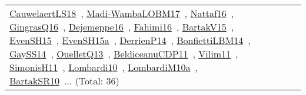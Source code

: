 {\begin{longtable}{lp{3cm}>{\raggedright\arraybackslash}p{6cm}>{\raggedright\arraybackslash}p{6cm}>{\raggedright\arraybackslash}p{8cm}}
\href{works/CauwelaertLS18.pdf}{CauwelaertLS18}~\cite{CauwelaertLS18}, \href{works/Madi-WambaLOBM17.pdf}{Madi-WambaLOBM17}~\cite{Madi-WambaLOBM17}, \href{works/Nattaf16.pdf}{Nattaf16}~\cite{Nattaf16}, \href{works/GingrasQ16.pdf}{GingrasQ16}~\cite{GingrasQ16}, \href{works/Dejemeppe16.pdf}{Dejemeppe16}~\cite{Dejemeppe16}, \href{works/Fahimi16.pdf}{Fahimi16}~\cite{Fahimi16}, \href{works/BartakV15.pdf}{BartakV15}~\cite{BartakV15}, \href{works/EvenSH15.pdf}{EvenSH15}~\cite{EvenSH15}, \href{works/EvenSH15a.pdf}{EvenSH15a}~\cite{EvenSH15a}, \href{works/DerrienP14.pdf}{DerrienP14}~\cite{DerrienP14}, \href{works/BonfiettiLBM14.pdf}{BonfiettiLBM14}~\cite{BonfiettiLBM14}, \href{works/GaySS14.pdf}{GaySS14}~\cite{GaySS14}, \href{works/OuelletQ13.pdf}{OuelletQ13}~\cite{OuelletQ13}, \href{works/BeldiceanuCDP11.pdf}{BeldiceanuCDP11}~\cite{BeldiceanuCDP11}, \href{works/Vilim11.pdf}{Vilim11}~\cite{Vilim11}, \href{works/SimonisH11.pdf}{SimonisH11}~\cite{SimonisH11}, \href{works/Lombardi10.pdf}{Lombardi10}~\cite{Lombardi10}, \href{works/LombardiM10a.pdf}{LombardiM10a}~\cite{LombardiM10a}, \href{works/BartakSR10.pdf}{BartakSR10}~\cite{BartakSR10}... (Total: 36)\\

\end{longtable}}
